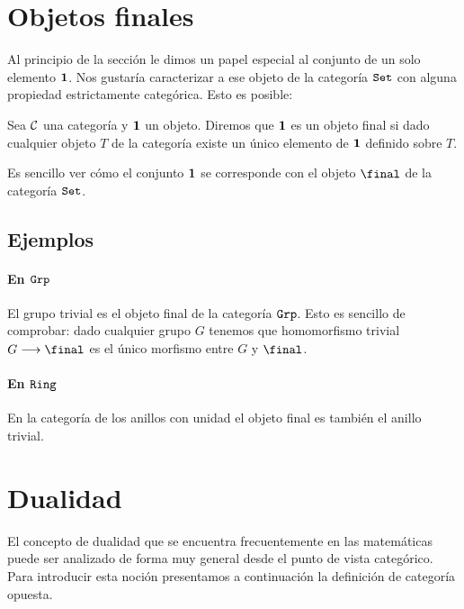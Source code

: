 \section{Objetos finales}
Al principio de la sección le dimos un papel especial al conjunto
de un solo elemento $\mathbf{1}$. Nos gustaría caracterizar a ese objeto de
la categoría $\texttt{Set}$ con alguna propiedad estrictamente categórica.
Esto es posible:

\begin{definition}
Sea $\mathcal{C}$ una categoría y $\mathbf{1}$ un objeto. Diremos que $\mathbf{1}$ es un objeto
final si dado cualquier objeto $T$ de la categoría existe un
único elemento de $\mathbf{1}$ definido sobre $T$.
\end{definition}

Es sencillo ver cómo el conjunto $\mathbf{1}$ se corresponde con el
objeto $\final$ de la categoría $\texttt{Set}$.

\subsection{Ejemplos}
\paragraph{En $\texttt{Grp}$}
El grupo trivial es el objeto final de la categoría $\texttt{Grp}$.
Esto es sencillo de comprobar: dado cualquier grupo $G$ tenemos
que homomorfismo trivial $\arr{G}{\final}$ es el único morfismo
entre $G$ y $\final$.

\paragraph{En $\texttt{Ring}$}
En la categoría de los anillos con unidad el objeto final es
también el anillo trivial.

\section{Dualidad}
El concepto de dualidad que se encuentra frecuentemente en las
matemáticas puede ser analizado de forma muy general desde el punto
de vista categórico. Para introducir esta noción presentamos a
continuación la definición de categoría opuesta.

